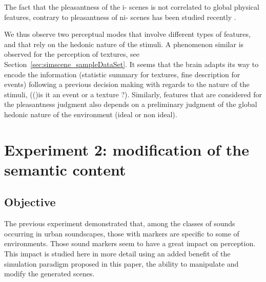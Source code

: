 \documentclass[twoside,twocolumn]{article}
\begin{document}
The fact that the pleasantness of the i- scenes is not correlated to global physical features, contrary to pleasantness of ni- scenes has been studied recently \cite{gozalo2015relationship}.

We thus observe two perceptual modes that involve different types of features, and that rely on the hedonic nature  of the stimuli. A phenomenon similar is observed for the perception of textures, see Section~\ref{sec:simscene_sampleDataSet}. It seems that the brain adapts its way to encode the information (statistic summary for textures, fine description for events) following a previous decision making with regards to the nature of the stimuli, (()\ie is it an event or a texture ?). Similarly, features that are considered for the pleasantness judgment also depends on a preliminary judgment of the global hedonic nature of the environment (ideal or non ideal).

\section{Experiment 2: modification of the semantic content}
\label{sec:modification}

\subsection{Objective}


The previous experiment demonstrated that, among the classes of sounds occurring in urban soundscapes, those with markers are specific to some of environments. Those sound markers seem to have a great impact on perception. This impact is studied here in more detail using an added benefit of the simulation paradigm proposed in this paper, the ability to manipulate and modify the generated scenes.

\end{document}
